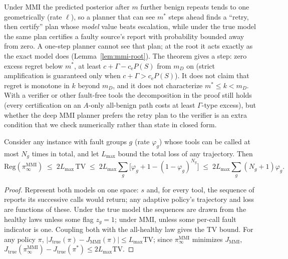 \begin{remark}
Under MMI the predicted posterior after $m$ further benign repeats tends to one geometrically (rate $\ell$), so a
planner that can see $m^*$ steps ahead finds a ``retry, then certify'' plan whose \emph{model} value beats escalation,
while under the true model the same plan certifies a faulty source's report with probability bounded away from zero.
A one-step planner cannot see that plan; at the root it acts exactly as the exact model does (Lemma~\ref{lem:mmi-root}).
The theorem gives a step: zero excess regret below $m^*$, at least $c+\Gamma-c_{\mathrm e}P(S)$ from $m_D$ on (strict amplification is guaranteed only when $c+\Gamma>c_{\mathrm e}P(S)$). It does not
claim that regret is monotone in $k$ beyond $m_D$, and it does not characterize $m^*\le k<m_D$. With a verifier or
other fault-free tools the decomposition in the proof still holds (every certification on an $A$-only all-benign path costs at
least $\Gamma$-type excess), but whether the deep MMI planner prefers the retry plan to the verifier is an extra
condition that we check numerically rather than state in closed form.
\end{remark}

\begin{proposition}\label{prop:converse}
Consider any instance with fault groups $g$ (rate $\varphi_g$) whose tools can be called at most $N_g$ times in total, and
let $L_{\max}$ bound the total loss of any trajectory. Then
\[
\mathrm{Reg}(\pi^{\mathrm{MMI}}_\infty)\;\le\;2L_{\max}\,\mathrm{TV}\;\le\;2L_{\max}\sum_g\big[\varphi_g+1-(1-\varphi_g)^{N_g}\big]\;\le\;2L_{\max}\sum_g(N_g+1)\varphi_g .
\]
\end{proposition}
\begin{proof}
Represent both models on one space: $s$ and, for every tool, the sequence of reports its successive calls would return;
any adaptive policy's trajectory and loss are functions of these. Under the true model the sequences are drawn from the
healthy laws unless some flag $z_g=1$; under MMI, unless some per-call fault indicator is one. Coupling both with the
all-healthy law gives the TV bound. For any policy $\pi$, $|J_{\mathrm{true}}(\pi)-J_{\mathrm{MMI}}(\pi)|\le L_{\max}\mathrm{TV}$;
since $\pi^{\mathrm{MMI}}_\infty$ minimizes $J_{\mathrm{MMI}}$,
$J_{\mathrm{true}}(\pi^{\mathrm{MMI}}_\infty)-J_{\mathrm{true}}(\pi^*)\le 2L_{\max}\mathrm{TV}$.
\end{proof}
